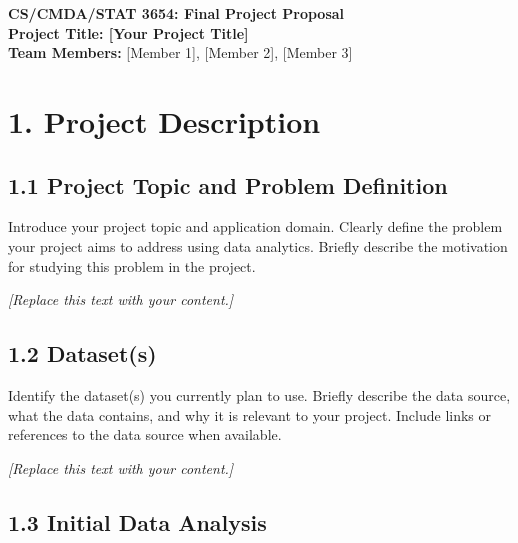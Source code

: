 \documentclass[11pt]{article}
\begin{document}

\begin{center}
    {\Large \textbf{CS/CMDA/STAT 3654: Final Project Proposal}}\\[8pt]

    {\large \textbf{Project Title: [Your Project Title]}}\\[6pt]

    \textbf{Team Members:} 
    [Member 1], [Member 2], [Member 3]
\end{center}

\vspace{0.5em}


\section*{1. Project Description}

\subsection*{1.1 Project Topic and Problem Definition}

Introduce your project topic and application domain. Clearly define the problem your project aims to address using data analytics. Briefly describe the motivation for studying this problem in the project.

\textit{[Replace this text with your content.]}

\subsection*{1.2 Dataset(s)}

Identify the dataset(s) you currently plan to use. Briefly describe the data source, what the data contains, and why it is relevant to your project. Include links or references to the data source when available.

\textit{[Replace this text with your content.]}

\subsection*{1.3 Initial Data Analysis}
\end{document}
